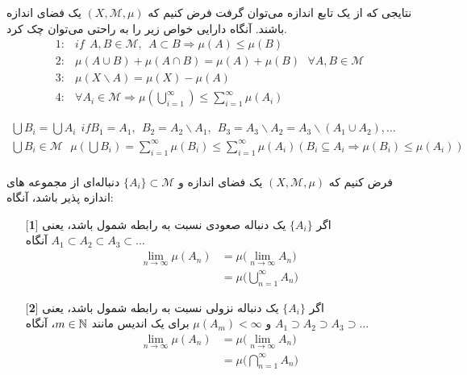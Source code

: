  نتایجی که از یک تابع اندازه می‌توان گرفت فرض کنیم که 
$ (X, \mathcal{M}, \mu) $ 
یک فضای اندازه باشند. آنگاه دارایی خواص زیر را به راحتی می‌توان چک کرد.
\begin{equation*}
\begin{split}
1 : & if \ \ A, B \in \mathcal{M}, \ \ A \subset B \Rightarrow \mu(A) \leq \mu(B) \\
2 : & \mu (A \cup B) + \mu (A \cap B) = \mu(A) + \mu(B) \ \ \ \forall A, B \in \mathcal{M} \\
3 : & \mu(X \backslash A) = \mu(X) - \mu(A) \\
4 : & \forall A_i \in \mathcal{M}  \Rightarrow \mu(\bigcup_{i = 1}^{\infty}) \leq \sum_{i = 1}^{\infty} \mu(A_i) 
\end{split}
\end{equation*}

\begin{remark}
\begin{equation*}
\begin{split}
\bigcup B_i = \bigcup A_i \ \ if  B_1 = A_1, \ \ B_2 = A_2 \backslash A_1, \ \ B_3 = A_3 \backslash A_2 = A_3 \backslash (A_1 \cup A_2), \ldots \\
\bigcup B_i \in \mathcal{M} \ \ \ \mu(\bigcup B_i) = \sum^{\infty}_{i = 1} \mu(B_i) \leq \sum^{\infty}_{i = 1} \mu(A_i) ( B_i \subseteq A_i \Rightarrow \mu(B_i) \leq \mu(A_i)) \\
\end{split}
\end{equation*}
\end{remark}

\begin{theorem}
فرض کنیم که 
$ (X, \mathcal{M}, \mu) $
یک فضای اندازه و 
$\{ A_i \}\subset \mathcal M$
دنباله‌ای از مجموعه های اندازه پذیر باشد، آنگاه:
\begin{itemize}
\item[{[{\bf 1}]}]
اگر $\{A_i\}$ یک دنباله صعودی نسبت به رابطه شمول باشد، یعنی
$A_1 \subset A_2 \subset A_3 \subset \ldots $
آنگاه 
\begin{align*}
\lim_{n \to \infty} \mu(A_n) &= \mu\Big(\lim_{n \to \infty} A_n\Big)\\
& = \mu\Big(\bigcup_{n = 1}^{\infty} A_n\Big)
\end{align*}
\item[{[{\bf 2}]}]
اگر $\{A_i\}$ یک دنباله نزولی نسبت به رابطه شمول باشد، یعنی
$A_1 \supset A_2 \supset A_3 \supset \ldots $
و $\mu(A_m)<\infty$ برای یک اندیس مانند $m\in{\mathbb N}$، آنگاه 
\begin{align*}
\lim_{n \to \infty} \mu(A_n) &= \mu\Big(\lim_{n \to \infty} A_n\Big)\\
& = \mu\Big(\bigcap_{n = 1}^{\infty} A_n\Big)
\end{align*}
\end{itemize}
\end{theorem}

